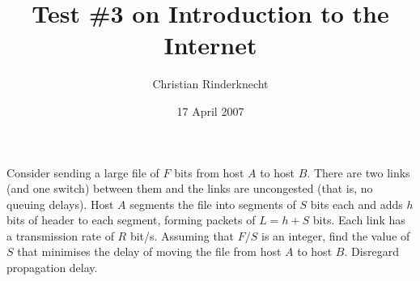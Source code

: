 \documentclass[12pt,a4paper]{article}
\title{Test \#3 on Introduction to the Internet}
\author{Christian Rinderknecht}
\date{17 April 2007}
\begin{document}
\maketitle

\thispagestyle{empty}

Consider sending a large file of \(F\) bits from host \(A\) to host
\(B\). There are two links (and one switch) between them and the links
are uncongested (that is, no queuing delays). Host \(A\) segments the
file into segments of \(S\) bits each and adds \(h\) bits of header to
each segment, forming packets of \(L = h + S\) bits. Each link has a
transmission rate of \(R\) bit/s. Assuming that \(F/S\) is an integer,
find the value of \(S\) that minimises the delay of moving the file
from host \(A\) to host \(B\). Disregard propagation delay.
\end{document}
